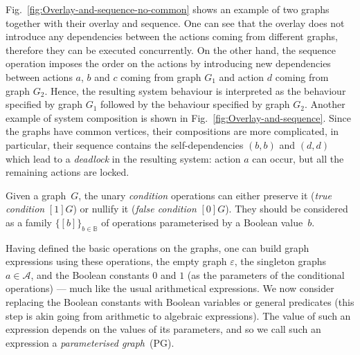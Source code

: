 Fig.~\ref{fig:Overlay-and-sequence-no-common} shows an example of
two graphs together with their overlay and sequence. One can see that
the overlay does not introduce any dependencies between the actions
coming from different graphs, therefore they can be executed concurrently.
On the other hand, the sequence operation imposes the order on the
actions by introducing new dependencies between actions $a$, $b$
and $c$ coming from graph $G_{1}$ and action $d$ coming from graph
$G_{2}$. Hence, the resulting system behaviour is interpreted as
the behaviour specified by graph $G_{1}$ followed by the behaviour
specified by graph $G_{2}$. Another example of system composition
is shown in Fig.~\ref{fig:Overlay-and-sequence}. Since the graphs
have common vertices, their compositions are more complicated, in
particular, their sequence contains the self-dependencies $(b,b)$
and $(d,d)$ which lead to a \emph{deadlock} in the resulting system:
action $a$ can occur, but all the remaining actions are locked.

Given a graph~$G$, the unary \emph{condition} operations can either
preserve it (\/\emph{true condition} $[1]G$) or nullify it (\/\emph{false
condition} $[0]G$). They should be considered as a family $\{[b]\}_{b\in\mathbb{B}}$
of operations parameterised by a Boolean value~$b$.

Having defined the basic operations on the graphs, one can build graph
expressions using these operations, the empty graph $\varepsilon$,
the singleton graphs $a\in\mathcal{A}$, and the Boolean constants
$0$ and $1$ (as the parameters of the conditional operations) ---
much like the usual arithmetical expressions. We now consider replacing
the Boolean constants with Boolean variables or general predicates
(this step is akin going from arithmetic to algebraic expressions).
The value of such an expression depends on the values of its parameters,
and so we call such an expression a \emph{parameterised graph}~(PG).

